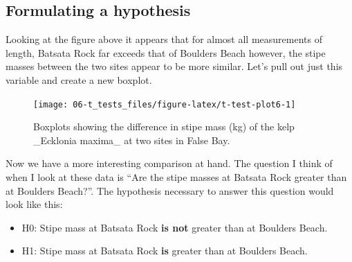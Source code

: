 \documentclass[english,10pt,a4paper,oneside]{book}
\providecommand{\tightlist}{%
  \setlength{\itemsep}{0pt}\setlength{\parskip}{0pt}}
\newenvironment{Shaded}{\begin{snugshade}}{\end{snugshade}}
\newcommand{\KeywordTok}[1]{\textcolor[rgb]{0.13,0.29,0.53}{\textbf{#1}}}
\newcommand{\DataTypeTok}[1]{\textcolor[rgb]{0.13,0.29,0.53}{#1}}
\newcommand{\StringTok}[1]{\textcolor[rgb]{0.31,0.60,0.02}{#1}}
\newcommand{\CommentTok}[1]{\textcolor[rgb]{0.56,0.35,0.01}{\textit{#1}}}
\newcommand{\OperatorTok}[1]{\textcolor[rgb]{0.81,0.36,0.00}{\textbf{#1}}}
\newcommand{\NormalTok}[1]{#1}
\theoremstyle{definition}
\theoremstyle{definition}
\theoremstyle{definition}
\theoremstyle{remark}
\begin{document}
\subsection{Formulating a hypothesis}\label{formulating-a-hypothesis}

Looking at the figure above it appears that for almost all measurements
of length, Batsata Rock far exceeds that of Boulders Beach however, the
stipe masses between the two sites appear to be more similar. Let's pull
out just this variable and create a new boxplot.

\begin{Shaded}
\end{Shaded}

\begin{figure}
\texttt{[image: 06-t\_tests\_files/figure-latex/t-test-plot6-1]} \caption{Boxplots showing the difference in stipe mass (kg) of the kelp _Ecklonia maxima_ at two sites in False Bay.}\label{fig:t-test-plot6}
\end{figure}

Now we have a more interesting comparison at hand. The question I think
of when I look at these data is \enquote{Are the stipe masses at Batsata
Rock greater than at Boulders Beach?}. The hypothesis necessary to
answer this question would look like this:

\begin{itemize}
\tightlist
\item
  H0: Stipe mass at Batsata Rock \textbf{is not} greater than at
  Boulders Beach.
\item
  H1: Stipe mass at Batsata Rock \textbf{is} greater than at Boulders
  Beach.
\end{itemize}
\end{document}

